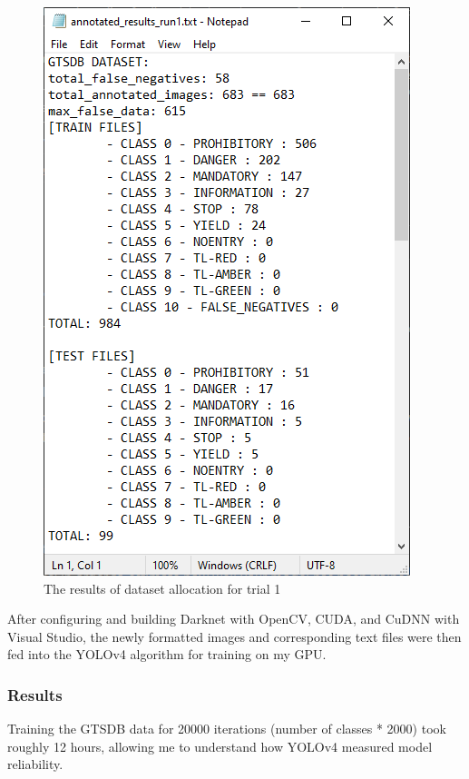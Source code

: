 \documentclass{article}
\begin{document}
            \begin{figure}[h]
                \centering
                \includegraphics[scale=0.5]{run_1_annotated}
                \caption{The results of dataset allocation for trial 1}
            \end{figure}
        
            After configuring and building Darknet with OpenCV, CUDA, and CuDNN with Visual Studio, the newly formatted images and corresponding text files were then fed into the YOLOv4 algorithm for training on my GPU. 
        
            \subsubsection{Results}
            
            Training the GTSDB data for 20000 iterations (number of classes * 2000) took roughly 12 hours, allowing me to understand how YOLOv4 measured model reliability. 
            
\end{document}
